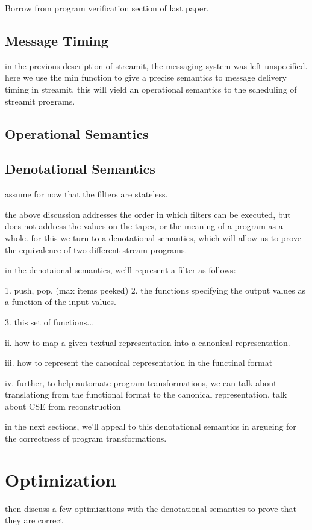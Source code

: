 Borrow from program verification section of last paper.

\subsection{Message Timing}

in the previous description of streamit, the messaging system was left
unspecified.  here we use the min function to give a precise semantics
to message delivery timing in streamit.  this will yield an
operational semantics to the scheduling of streamit programs.

\subsection{Operational Semantics}

\subsection{Denotational Semantics}

assume for now that the filters are stateless.

the above discussion addresses the order in which filters can be
executed, but does not address the values on the tapes, or the meaning
of a program as a whole.  for this we turn to a denotational
semantics, which will allow us to prove the equivalence of two
different stream programs.

in the denotaional semantics, we'll represent a filter as follows:

1. push, pop, (max items peeked)
2. the functions specifying the output values as a function of the
input values.

3. this set of functions...

ii. how to map a given textual representation into a canonical
representation.

iii. how to represent the canonical representation in the functinal
format

iv. further, to help automate program transformations, we can talk
about translationg from the functional format to the canonical
representation.  talk about CSE from reconstruction

in the next sections, we'll appeal to this denotational semantics in
argueing for the correctness of program transformations.

\section{Optimization}

then discuss a few optimizations with the denotational semantics to
prove that they are correct

